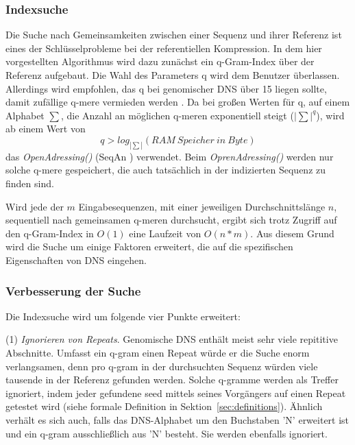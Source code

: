 \documentclass[12pt]{article}
\begin{document}
\subsubsection{Indexsuche}
Die Suche nach Gemeinsamkeiten zwischen einer Sequenz und ihrer Referenz ist eines der Schlüsselprobleme bei der referentiellen Kompression. In dem hier vorgestellten Algorithmus wird dazu zunächst ein q-Gram-Index über der Referenz aufgebaut. Die Wahl des Parameters q wird dem Benutzer überlassen. Allerdings wird empfohlen, das q bei genomischer DNS über 15 liegen sollte, damit zufällige q-mere vermieden werden \cite{wandelt14trends}. Da bei großen Werten für q, auf einem Alphabet $\sum$, die Anzahl an möglichen q-meren exponentiell steigt ($|\sum|^{q}$), wird ab einem Wert von 
\begin{equation}
q>log_{|\sum|}(RAM~Speicher~in~Byte)
\end{equation}
das \textit{OpenAdressing()} (SeqAn \cite{doering08seqan}) verwendet. Beim \textit{OprenAdressing()} werden nur solche q-mere gespeichert, die auch tatsächlich in der indizierten Sequenz zu finden sind.

Wird jede der $m$ Eingabesequenzen, mit einer jeweiligen Durchschnittslänge $n$, sequentiell nach gemeinsamen q-meren durchsucht, ergibt sich trotz Zugriff auf den q-Gram-Index in $O(1)$ eine Laufzeit von $O(n*m)$. Aus diesem Grund wird die Suche um einige Faktoren erweitert, die auf die spezifischen Eigenschaften von DNS eingehen.

\subsubsection{Verbesserung der Suche}
Die Indexsuche wird um folgende vier Punkte erweitert:

(1) \emph{Ignorieren von Repeats}. Genomische DNS enthält meist sehr viele repititive Abschnitte. Umfasst ein q-gram einen Repeat würde er die Suche enorm verlangsamen, denn pro q-gram in der durchsuchten Sequenz würden viele tausende in der Referenz gefunden werden. Solche q-gramme werden als Treffer ignoriert, indem jeder gefundene seed mittels seines Vorgängers auf einen Repeat getestet wird (siehe formale Definition in Sektion~\ref{sec:definitions}). Ähnlich verhält es sich auch, falls das DNS-Alphabet um den Buchstaben 'N' erweitert ist und ein q-gram ausschließlich aus 'N' besteht. Sie werden ebenfalls ignoriert.
\end{document}
